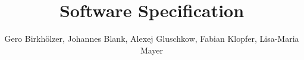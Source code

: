 \title{Software Specification}
\author{Gero Birkhölzer, Johannes Blank, Alexej Gluschkow, Fabian Klopfer, Lisa-Maria Mayer}
\maketitle
